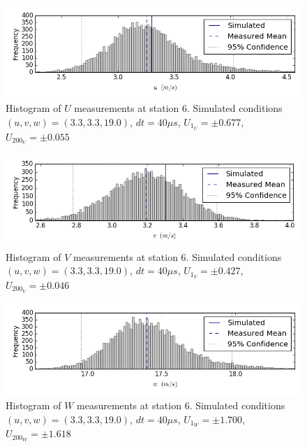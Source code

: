 \begin{figure}[H]
\centering
\includegraphics[width=6in]{figs/Ely_May28th06002/uncertainty_Ely_May28th06002_U}
\caption{Histogram of $U$ measurements at station 6. Simulated conditions $(u,v,w)=(3.3, 3.3, 19.0)$, $dt=40 \mu s$, $U_{1_{U}}=\pm 0.677$, $U_{200_{U}}=\pm 0.055$}
\label{fig:uncertainty_Ely_May28th06002_U}
\end{figure}


\begin{figure}[H]
\centering
\includegraphics[width=6in]{figs/Ely_May28th06002/uncertainty_Ely_May28th06002_V}
\caption{Histogram of $V$ measurements at station 6. Simulated conditions $(u,v,w)=(3.3, 3.3, 19.0)$, $dt=40 \mu s$, $U_{1_{V}}=\pm 0.427$, $U_{200_{V}}=\pm 0.046$}
\label{fig:uncertainty_Ely_May28th06002_V}
\end{figure}


\begin{figure}[H]
\centering
\includegraphics[width=6in]{figs/Ely_May28th06002/uncertainty_Ely_May28th06002_W}
\caption{Histogram of $W$ measurements at station 6. Simulated conditions $(u,v,w)=(3.3, 3.3, 19.0)$, $dt=40 \mu s$, $U_{1_{W}}=\pm 1.700$, $U_{200_{W}}=\pm 1.618$}
\label{fig:uncertainty_Ely_May28th06002_W}
\end{figure}


